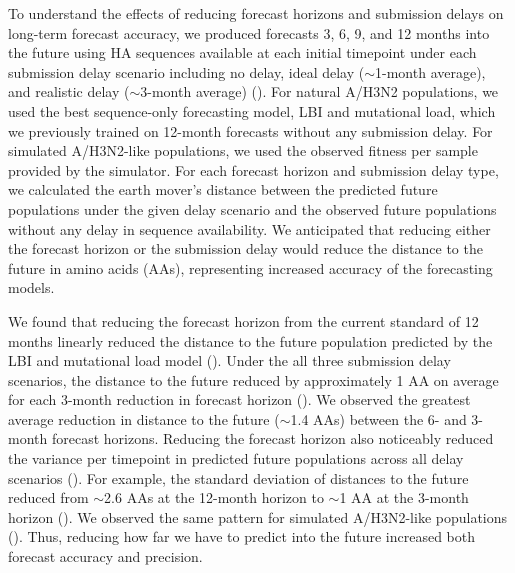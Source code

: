 \documentclass[9pt,lineno]{elife}
\begin{document}
To understand the effects of reducing forecast horizons and submission delays on long-term forecast accuracy, we produced forecasts 3, 6, 9, and 12 months into the future using HA sequences available at each initial timepoint under each submission delay scenario including no delay, ideal delay ($\sim$1-month average), and realistic delay ($\sim$3-month average) ().
For natural A/H3N2 populations, we used the best sequence-only forecasting model, LBI and mutational load, which we previously trained on 12-month forecasts without any submission delay.
For simulated A/H3N2-like populations, we used the observed fitness per sample provided by the simulator.
For each forecast horizon and submission delay type, we calculated the earth mover's distance between the predicted future populations under the given delay scenario and the observed future populations without any delay in sequence availability.
We anticipated that reducing either the forecast horizon or the submission delay would reduce the distance to the future in amino acids (AAs), representing increased accuracy of the forecasting models.

We found that reducing the forecast horizon from the current standard of 12 months linearly reduced the distance to the future population predicted by the LBI and mutational load model ().
Under the all three submission delay scenarios, the distance to the future reduced by approximately 1 AA on average for each 3-month reduction in forecast horizon ().
We observed the greatest average reduction in distance to the future ($\sim$1.4 AAs) between the 6- and 3-month forecast horizons.
Reducing the forecast horizon also noticeably reduced the variance per timepoint in predicted future populations across all delay scenarios ().
For example, the standard deviation of distances to the future reduced from $\sim$2.6 AAs at the 12-month horizon to $\sim$1 AA at the 3-month horizon ().
We observed the same pattern for simulated A/H3N2-like populations ().
Thus, reducing how far we have to predict into the future increased both forecast accuracy and precision.
\end{document}
